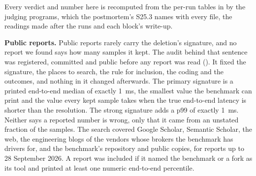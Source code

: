 \documentclass[10pt,journal,onecolumn]{IEEEtran}
\begin{document}
\begin{table}[tb]
\caption{\textbf{With the clock stepped back under them, six tools that read one clock each
handled a value below zero their own way.} S1: each tool once as it is and once while the driver's
wall clock stepped back by the step shown at gaps drawn around a fifth of a second,
\sOneRoundsWord{} rounds. Steps: how many a stepped run made, lowest and highest round. Below zero:
how many values below zero the tool's own output showed in a stepped run, lowest and highest round,
and the most it showed in any control; the Pravega benchmark's row counts the one that stopped its
statistics, and Quiver's its transfers, as it calls messages.}
\label{stab:sone}
\centering
\footnotesize

\end{table}

Every verdict and number here is recomputed from the per-run tables in
 by the judging programs, which the postmortem's S25.3 names
with every file, the readings made after the runs and each block's write-up.


\textbf{Public reports.}\label{s:reach} Public reports rarely carry the deletion's signature, and
no report we found says how many samples it kept. The audit behind that sentence was registered,
committed and public before any report was read (). It fixed
the signature, the places to search, the rule for inclusion, the coding and the outcomes, and
nothing in it changed afterwards. The primary signature is a printed end-to-end median of exactly
1~ms, the smallest value the benchmark can print and the value every kept sample takes when the
true end-to-end latency is shorter than the resolution. The strong signature adds a p99 of exactly
1~ms. Neither says a reported number is wrong, only that it came from an unstated fraction of the
samples. The search covered Google Scholar, Semantic Scholar, the web, the
engineering blogs of the vendors whose brokers the benchmark has drivers for, and the benchmark's
repository and public copies, for reports up to 28 September 2026. A report was included
if it named the benchmark or a fork as its tool and printed at least one numeric end-to-end
percentile.
\end{document}
